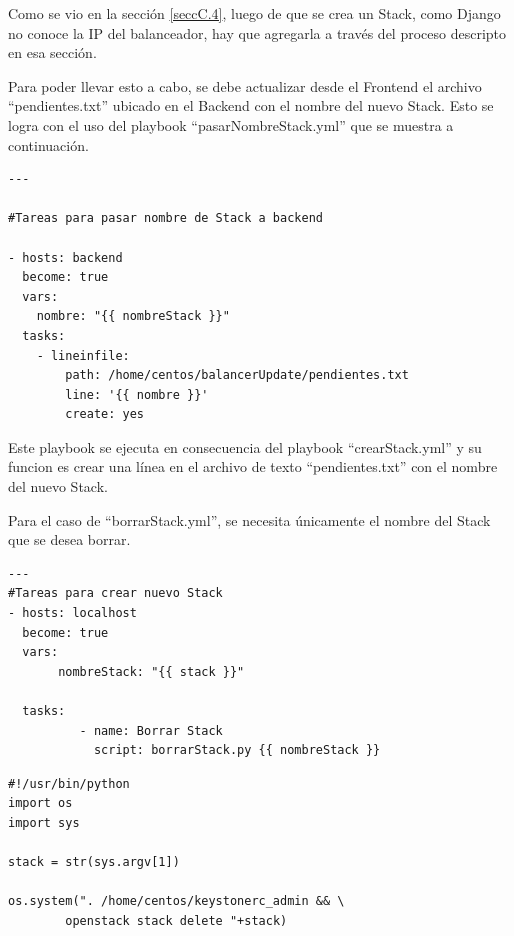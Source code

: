 \documentclass[12pt,a4paper,oneside]{book}
\begin{document}
\vspace{0.5cm}

Como se vio en la sección \ref{seccC.4}, luego de que se crea un Stack, como Django no conoce la IP del balanceador, hay que agregarla a través del proceso descripto en esa sección. 

\vspace{0.5cm}

Para poder llevar esto a cabo, se debe actualizar desde el Frontend el archivo ``pendientes.txt'' ubicado en el Backend con el nombre del nuevo Stack. Esto se logra con el uso del playbook ``pasarNombreStack.yml'' que se muestra a continuación. 

\begin{lstlisting}[style=codigobase,  caption= pasarNombreStack.yml]
---

#Tareas para pasar nombre de Stack a backend

- hosts: backend
  become: true
  vars:
    nombre: "{{ nombreStack }}"
  tasks:
    - lineinfile:
        path: /home/centos/balancerUpdate/pendientes.txt
        line: '{{ nombre }}'
        create: yes
\end{lstlisting}

\vspace{0.5cm}

Este playbook se ejecuta en consecuencia del playbook ``crearStack.yml'' y su funcion es crear una línea en el archivo de texto ``pendientes.txt'' con el nombre del nuevo Stack.


\vspace{0.5cm}

Para el caso de ``borrarStack.yml'', se necesita únicamente el nombre del Stack que se desea borrar.

\vspace{0,5cm}

\begin{lstlisting}[style=codigobase,  caption= borrarStack.yml]
---
#Tareas para crear nuevo Stack
- hosts: localhost
  become: true
  vars:
       nombreStack: "{{ stack }}"
                 
  tasks:
          - name: Borrar Stack
            script: borrarStack.py {{ nombreStack }}
\end{lstlisting}

\vspace{0,5cm}

\begin{lstlisting}[style=codigobase,  caption= borrarStack.py]
#!/usr/bin/python
import os
import sys

stack = str(sys.argv[1])

os.system(". /home/centos/keystonerc_admin && \
        openstack stack delete "+stack)
\end{lstlisting}
\end{document}
